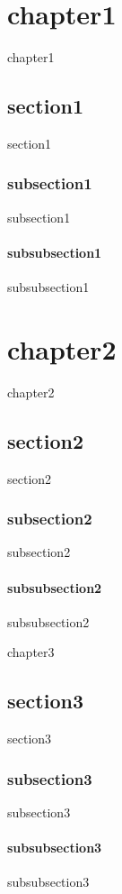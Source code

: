 \chapter{chapter1}

chapter1

\section{section1}

section1

\subsection{subsection1}

subsection1

\subsubsection{subsubsection1}

subsubsection1

\chapter*{chapter2}

chapter2

\section*{section2}

section2

\subsection*{subsection2}

subsection2

\subsubsection*{subsubsection2}

subsubsection2


chapter3

\section{section3}

section3

\subsection{subsection3}

subsection3

\subsubsection{subsubsection3}

subsubsection3